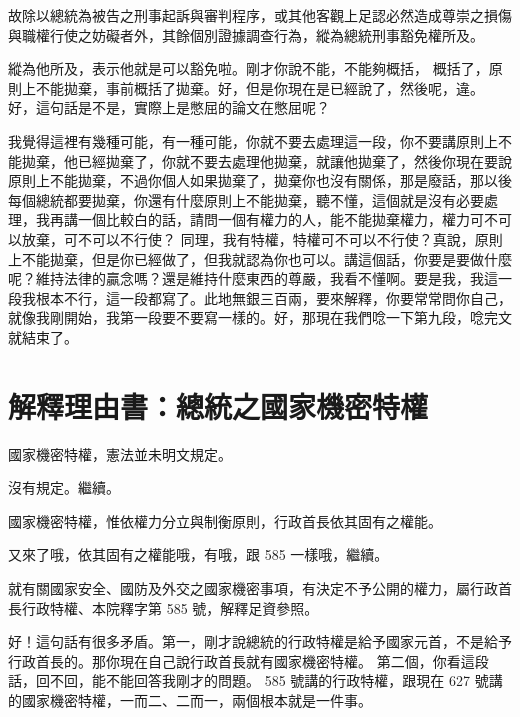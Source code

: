 \hypertarget{c11:cue:282}{}故除以總統為被告之刑事起訴與審判程序，或其他客觀上足認必然造成尊崇之損傷與職權行使之妨礙者外，其餘個別證據調查行為，縱為總統刑事豁免權所及。

\hypertarget{c11:cue:283}{}縱為他所及，表示他就是可以豁免啦。剛才你說不能，不能夠概括，
\hypertarget{c11:cue:284}{}概括了，原則上不能拋棄，事前概括了拋棄。好，但是你現在是已經說了，然後呢，違。
\hypertarget{c11:cue:285}{}好，這句話是不是，實際上是憋屈的論文在憋屈呢？

\hypertarget{c11:cue:286}{}我覺得這裡有幾種可能，有一種可能，你就不要去處理這一段，你不要講原則上不能拋棄，他已經拋棄了，你就不要去處理他拋棄，就讓他拋棄了，然後你現在要說原則上不能拋棄，不過你個人如果拋棄了，拋棄你也沒有關係，那是廢話，那以後每個總統都要拋棄，你還有什麼原則上不能拋棄，聽不懂，這個就是沒有必要處理，我再講一個比較白的話，請問一個有權力的人，能不能拋棄權力，權力可不可以放棄，可不可以不行使？
\hypertarget{c11:cue:287}{}同理，我有特權，特權可不可以不行使？真說，原則上不能拋棄，但是你已經做了，但我就認為你也可以。講這個話，你要是要做什麼呢？維持法律的贏念嗎？還是維持什麼東西的尊嚴，我看不懂啊。要是我，我這一段我根本不行，這一段都寫了。此地無銀三百兩，要來解釋，你要常常問你自己，就像我剛開始，我第一段要不要寫一樣的。好，那現在我們唸一下第九段，唸完文就結束了。

\section{解釋理由書：總統之國家機密特權}

\hypertarget{c11:cue:288}{}國家機密特權，憲法並未明文規定。\par{}沒有規定。繼續。

\hypertarget{c11:cue:289}{}國家機密特權，惟依權力分立與制衡原則，行政首長依其固有之權能。\par{}又來了哦，依其固有之權能哦，有哦，跟 585 一樣哦，繼續。

\hypertarget{c11:cue:290}{}就有關國家安全、國防及外交之國家機密事項，有決定不予公開的權力，屬行政首長行政特權、本院釋字第 585 號，解釋足資參照。

\hypertarget{c11:cue:291}{}好！這句話有很多矛盾。第一，剛才說總統的行政特權是給予國家元首，不是給予行政首長的。那你現在自己說行政首長就有國家機密特權。
\hypertarget{c11:cue:292}{}第二個，你看這段話，回不回，能不能回答我剛才的問題。
\hypertarget{c11:cue:293}{}585 號講的行政特權，跟現在 627 號講的國家機密特權，一而二、二而一，兩個根本就是一件事。

